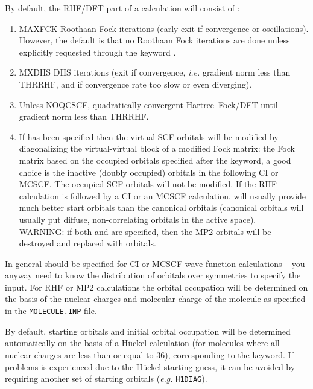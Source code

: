By default, the RHF/DFT part of a calculation will consist of :
\begin{enumerate}
\item {MAXFCK Roothaan Fock iterations (early exit if convergence
    or oscillations). However, the default is that no Roothaan Fock
iterations are done unless explicitly requested through the keyword
.
}
\item {MXDIIS DIIS iterations (exit if convergence, {\it i.e.\/} gradient norm
    less than THRRHF, and if convergence rate too slow or even diverging).
}
\item {Unless NOQCSCF, quadratically convergent Hartree--Fock/DFT until
    gradient norm less than THRRHF.
}
\item{If  has been specified
    then the virtual SCF orbitals will be modified by diagonalizing
    the virtual-virtual block of
    a modified Fock matrix: the Fock matrix
    based on the occupied orbitals specified after the keyword, a
    good choice is the inactive (doubly occupied) orbitals in the
    following CI or MCSCF.
    The occupied SCF orbitals will not be modified.
    If the RHF calculation is followed by a CI or an MCSCF calculation,
     will usually provide much
    better start orbitals than the canonical orbitals (canonical
    orbitals will usually put diffuse, non-correlating orbitals in the
    active space). \\
    WARNING: if both  and  are specified,
    then the MP2 orbitals will be destroyed and replaced with 
    orbitals.
}
\end{enumerate}

In general  should be specified for CI or MCSCF
wave function calculations -- you anyway need to know the distribution
of orbitals over symmetries to specify the  input.
For RHF
or MP2
calculations the orbital occupation will be determined on the
basis of the nuclear charges and molecular charge of the molecule as
specified in the \verb|MOLECULE.INP| file.

By default, starting orbitals and initial orbital occupation will
be determined automatically on the basis of a H\"{u}ckel
calculation (for molecules where all nuclear charges are
less than or equal to 36), corresponding to the  keyword.
If problems is experienced due to the
H\"{u}ckel starting guess, it can be avoided by requiring another set of
starting orbitals ({\it e.g.\/} \verb|H1DIAG|).

